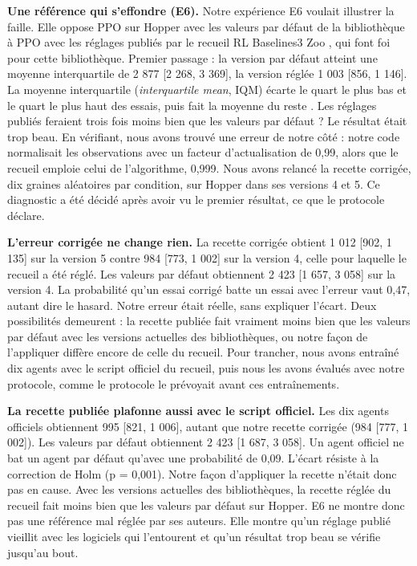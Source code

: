 \documentclass[11pt,a4paper]{article}
\begin{document}
\textbf{Une référence qui s'effondre (E6).} Notre expérience E6 voulait
illustrer la faille. Elle oppose PPO sur Hopper avec les valeurs par
défaut de la bibliothèque à PPO avec les réglages publiés par le recueil
RL Baselines3 Zoo \autocite{raffin2020zoo}, qui font foi pour cette
bibliothèque. Premier passage : la version par défaut atteint une
moyenne interquartile de 2 877 {[}2 268, 3 369{]}, la version réglée 1
003 {[}856, 1 146{]}. La moyenne interquartile (\emph{interquartile
mean}, IQM) écarte le quart le plus bas et le quart le plus haut des
essais, puis fait la moyenne du reste \autocite{agarwal2021precipice}.
Les réglages publiés feraient trois fois moins bien que les valeurs par
défaut ? Le résultat était trop beau. En vérifiant, nous avons trouvé
une erreur de notre côté : notre code normalisait les observations avec
un facteur d'actualisation de 0,99, alors que le recueil emploie celui
de l'algorithme, 0,999. Nous avons relancé la recette corrigée, dix
graines aléatoires par condition, sur Hopper dans ses versions 4 et 5.
Ce diagnostic a été décidé après avoir vu le premier résultat, ce que le
protocole déclare.

\textbf{L'erreur corrigée ne change rien.} La recette corrigée obtient 1
012 {[}902, 1 135{]} sur la version 5 contre 984 {[}773, 1 002{]} sur la
version 4, celle pour laquelle le recueil a été réglé. Les valeurs par
défaut obtiennent 2 423 {[}1 657, 3 058{]} sur la version 4. La
probabilité qu'un essai corrigé batte un essai avec l'erreur vaut 0,47,
autant dire le hasard. Notre erreur était réelle, sans expliquer
l'écart. Deux possibilités demeurent : la recette publiée fait vraiment
moins bien que les valeurs par défaut avec les versions actuelles des
bibliothèques, ou notre façon de l'appliquer diffère encore de celle du
recueil. Pour trancher, nous avons entraîné dix agents avec le script
officiel du recueil, puis nous les avons évalués avec notre protocole,
comme le protocole le prévoyait avant ces entraînements.

\textbf{La recette publiée plafonne aussi avec le script officiel.} Les
dix agents officiels obtiennent 995 {[}821, 1 006{]}, autant que notre
recette corrigée (984 {[}777, 1 002{]}). Les valeurs par défaut
obtiennent 2 423 {[}1 687, 3 058{]}. Un agent officiel ne bat un agent
par défaut qu'avec une probabilité de 0,09. L'écart résiste à la
correction de Holm (p = 0,001). Notre façon d'appliquer la recette
n'était donc pas en cause. Avec les versions actuelles des
bibliothèques, la recette réglée du recueil fait moins bien que les
valeurs par défaut sur Hopper. E6 ne montre donc pas une référence mal
réglée par ses auteurs. Elle montre qu'un réglage publié vieillit avec
les logiciels qui l'entourent et qu'un résultat trop beau se vérifie
jusqu'au bout.
\end{document}

